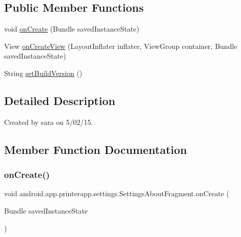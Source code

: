 \subsection*{Public Member Functions}
\begin{DoxyCompactItemize}
\item 
void \hyperlink{classandroid_1_1app_1_1printerapp_1_1settings_1_1_settings_about_fragment_a44ef1c98a9c1d609dd9a4ba0b8039569}{on\+Create} (Bundle saved\+Instance\+State)
\item 
View \hyperlink{classandroid_1_1app_1_1printerapp_1_1settings_1_1_settings_about_fragment_a26b00696e1c50d18ad8f57abcbebf086}{on\+Create\+View} (Layout\+Inflater inflater, View\+Group container, Bundle saved\+Instance\+State)
\item 
String \hyperlink{classandroid_1_1app_1_1printerapp_1_1settings_1_1_settings_about_fragment_a21bf9ae07915a5c7e8dc6293ae0699e5}{set\+Build\+Version} ()
\end{DoxyCompactItemize}


\subsection{Detailed Description}
Created by sara on 5/02/15. 

\subsection{Member Function Documentation}
\mbox{\label{classandroid_1_1app_1_1printerapp_1_1settings_1_1_settings_about_fragment_a44ef1c98a9c1d609dd9a4ba0b8039569}} 
\subsubsection{\texorpdfstring{on\+Create()}{onCreate()}}
{\footnotesize\ttfamily void android.\+app.\+printerapp.\+settings.\+Settings\+About\+Fragment.\+on\+Create (\begin{DoxyParamCaption}\item[{Bundle}]{saved\+Instance\+State }\end{DoxyParamCaption})}

